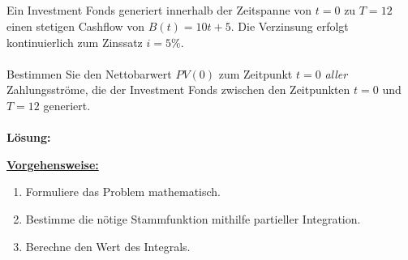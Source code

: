 \subsection*{}
Ein Investment Fonds generiert innerhalb der Zeitspanne von $t=0$ zu $T=12$ einen
stetigen Cashflow von $B(t) = 10 t + 5$.
Die Verzinsung erfolgt kontinuierlich zum Zinssatz $i = 5 \%$.
\\
\\
Bestimmen Sie den Nettobarwert $PV(0)$ zum Zeitpunkt $t = 0$ \textit{aller} Zahlungsströme,
die der Investment Fonds zwischen den Zeitpunkten $t = 0$ und $T = 12$ generiert.\\
\\
\textbf{Lösung:}
\begin{mdframed}
\underline{\textbf{Vorgehensweise:}}
\begin{enumerate}
\item Formuliere das Problem mathematisch.
\item Bestimme die nötige Stammfunktion mithilfe partieller Integration.
\item Berechne den Wert des Integrals.
\end{enumerate}
\end{mdframed}

